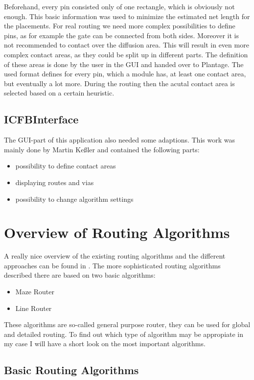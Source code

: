 Beforehand, every pin consisted only of one rectangle, which is obviously not enough. This basic information was used to minimize the estimated net length for the placements. For real routing we need more complex possibilities to define pins, as for example the gate can be connected from both sides. Moreover it is not recommended to contact over the diffusion area. This will result in even more complex contact areas, as they could be split up in different parts. The definition of these areas is done by the user in the GUI and handed over to Plantage. The used format defines for every pin, which a module has, at least one contact area, but eventually a lot more. During the routing then the acutal contact area is selected based on a certain heuristic.

\subsection{ICFBInterface}
The GUI-part of this application also needed some adaptions. This work was mainly done by Martin Keßler and contained the following parts:

\begin{itemize}
\item possibility to define contact areas
\item displaying routes and vias
\item possibility to change algorithm settings
\end{itemize}	

\section{Overview of Routing Algorithms}
A really nice overview of the existing routing algorithms and the different approaches can be found in \cite[page 149 till 201]{springer:eda_analog_routing}. The more sophisticated routing algorithms described there are based on two basic algorithms:
\begin{itemize}
\item Maze Router
\item Line Router
\end{itemize}
These algorithms are so-called general purpose router, they can be used for global and detailed routing. To find out which type of algorithm may be appropiate in my case I will have a short look on the most important algorithms.

\subsection{Basic Routing Algorithms}
